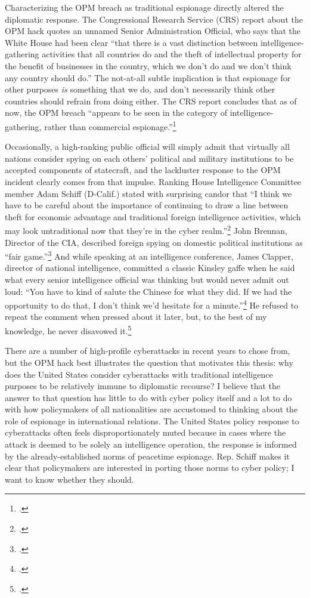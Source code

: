 \documentclass{memoir}
\begin{document}
\begin{refsegment}
Characterizing the OPM breach as traditional espionage directly altered the diplomatic response. The Congressional Research Service (CRS) report about the OPM hack quotes an unnamed Senior Administration Official, who says that the White House had been clear ``that there is a vast distinction between intelligence-gathering activities that all countries do and the theft of intellectual property for the benefit of businesses in the country, which we don't do and we don't think any country should do.'' The not-at-all subtle implication is that espionage for other purposes \emph{is} something that we do, and don't necessarily think other countries should refrain from doing either. The CRS report concludes that as of now, the OPM breach ``appears to be seen in the category of intelligence-gathering, rather than commercial espionage.''\footcite{finklea_cyber_2015}

Occasionally, a high-ranking public official will simply admit that virtually all nations consider spying on each others' political and military institutions to be accepted components of statecraft, and the lackluster response to the OPM incident clearly comes from that impulse. Ranking House Intelligence Committee member Adam Schiff (D-Calif.) stated with surprising candor that ``I think we have to be careful about the importance of continuing to draw a line between theft for economic advantage and traditional foreign intelligence activities, which may look untraditional now that they’re in the cyber realm.''\footcite{nakashima_hacks_2015} John Brennan, Director of the CIA, described foreign spying on domestic political institutions as ``fair game.''\footcite{sanger_u.s._2016} And while speaking at an intelligence conference, James Clapper, director of national intelligence, committed a classic Kinsley gaffe when he said what every senior intelligence official was thinking but would never admit out loud: ``You have to kind of salute the Chinese for what they did. If we had the opportunity to do that, I don't think we'd hesitate for a minute.''\footcite{pepitone_clapper_2015} He refused to repeat the comment when pressed about it later, but, to the best of my knowledge, he never disavowed it.\footcite{sanger_u.s._2015}

There are a number of high-profile cyberattacks in recent years to chose from, but the OPM hack best illustrates the question that motivates this thesis: why does the United States consider cyberattacks with traditional intelligence purposes to be relatively immune to diplomatic recourse? I believe that the answer to that question has little to do with cyber policy itself and a lot to do with how policymakers of all nationalities are accustomed to thinking about the role of espionage in international relations. The United States policy response to cyberattacks often feels disproportionately muted because in cases where the attack is deemed to be solely an intelligence operation, the response is informed by the already-established norms of peacetime espionage. Rep. Schiff makes it clear that policymakers are interested in porting those norms to cyber policy; I want to know whether they should.


\end{refsegment}
\end{document}
